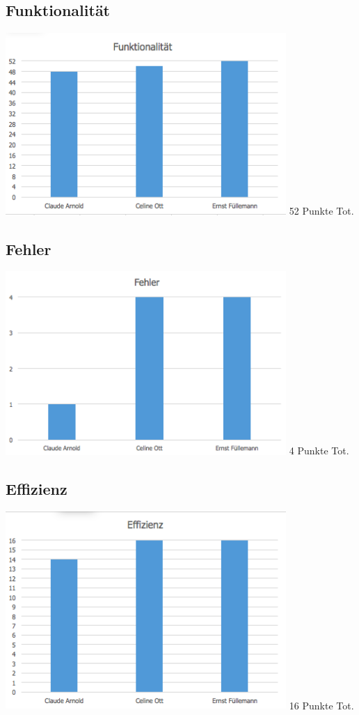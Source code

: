 \documentclass[a4,12pt]{scrartcl}
\begin{document}
\subsection{Funktionalität}
\includegraphics[width=0.8\textwidth]{./pictures/funktionalitaet.png}
52 Punkte Tot.

\subsection{Fehler}
\includegraphics[width=0.8\textwidth]{./pictures/fehler.png}
4 Punkte Tot.

\subsection{Effizienz}
\includegraphics[width=0.8\textwidth]{./pictures/effizienz.png}
16 Punkte Tot.
\end{document}
